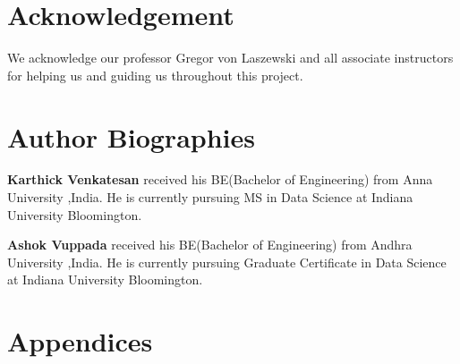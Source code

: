 \documentclass[9pt,twocolumn,twoside]{../../styles/osajnl}
\begin{document}
\section{Acknowledgement}

We acknowledge our professor Gregor von Laszewski and all associate instructors for helping us and guiding us throughout this project.




 \section*{Author Biographies}
\begingroup
\setlength\intextsep{0pt}
\begin{minipage}[t][3.2cm][t]{1.0\columnwidth} 
  \noindent
{\bfseries Karthick Venkatesan} received his BE(Bachelor of Engineering) from Anna University ,India.  He is currently pursuing MS in  Data Science at Indiana University Bloomington.
\end{minipage}
\begin{minipage}[t][3.2cm][t]{1.0\columnwidth} 
  \noindent
{\bfseries Ashok Vuppada} received his BE(Bachelor of Engineering) from Andhra University ,India.  He is currently pursuing Graduate Certificate in  Data Science at Indiana University Bloomington.
\end{minipage}
\endgroup

\newpage

\appendix
\section{Appendices}
\end{document}

